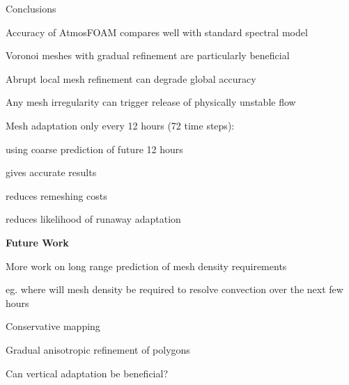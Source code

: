 \begin{slide}{Conclusions}

\begin{list0}

\item Accuracy of AtmosFOAM compares well with standard spectral model

\item Voronoi meshes with gradual refinement are particularly beneficial

\item Abrupt local mesh refinement can degrade global accuracy

\item Any mesh irregularity can trigger release of physically unstable flow

\item Mesh adaptation only every 12 hours (72 time steps):

\begin{list1}
\item using coarse prediction of future 12 hours
\item gives accurate results
\item reduces remeshing costs
\item reduces likelihood of runaway adaptation
\end{list1}
\end{list0}

\begin{center}\Large\bfseries Future Work \end{center}

\begin{list0}

\item More work on long range prediction of mesh density requirements

\begin{list2}
    \item eg. where will mesh density be required to resolve convection over the
    next few hours
\end{list2}

\item Conservative mapping

\item Gradual anisotropic refinement of polygons

\item Can vertical adaptation be beneficial?

\end{list0}

\end{slide}